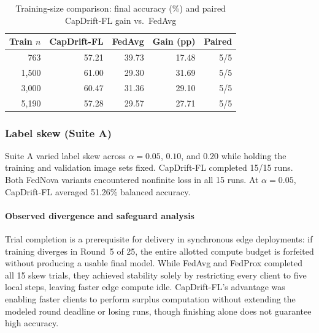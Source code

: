 \documentclass[conference]{IEEEtran}
\begin{document}
\begin{table}[t]\caption{Training-size comparison: final accuracy (\%) and paired CapDrift-FL gain vs.\ FedAvg}\label{tab:controlled_sizes}

\centering\scriptsize\begin{tabular}{@{}rrrrr@{}}\toprule

Train $n$ & CapDrift-FL & FedAvg & Gain (pp) & Paired\\\midrule

763 & 57.21 & 39.73 & 17.48 & 5/5\\

1,500 & 61.00 & 29.30 & 31.69 & 5/5\\

3,000 & 60.47 & 31.36 & 29.10 & 5/5\\

5,190 & 57.28 & 29.57 & 27.71 & 5/5\\

\bottomrule\end{tabular}\end{table}

\subsubsection{Label skew (Suite A)}

Suite A varied label skew across $\alpha=0.05$, $0.10$, and $0.20$ while holding the training and validation image sets fixed. CapDrift-FL completed 15/15 runs. Both FedNova variants encountered nonfinite loss in all 15 runs. At $\alpha=0.05$, CapDrift-FL averaged 51.26\% balanced accuracy.

\paragraph{Observed divergence and safeguard analysis}
Trial completion is a prerequisite for delivery in synchronous edge deployments: if training diverges in Round~5 of 25, the entire allotted compute budget is forfeited without producing a usable final model. While FedAvg and FedProx completed all 15 skew trials, they achieved stability solely by restricting every client to five local steps, leaving faster edge compute idle. CapDrift-FL's advantage was enabling faster clients to perform surplus computation without extending the modeled round deadline or losing runs, though finishing alone does not guarantee high accuracy.
\end{document}
